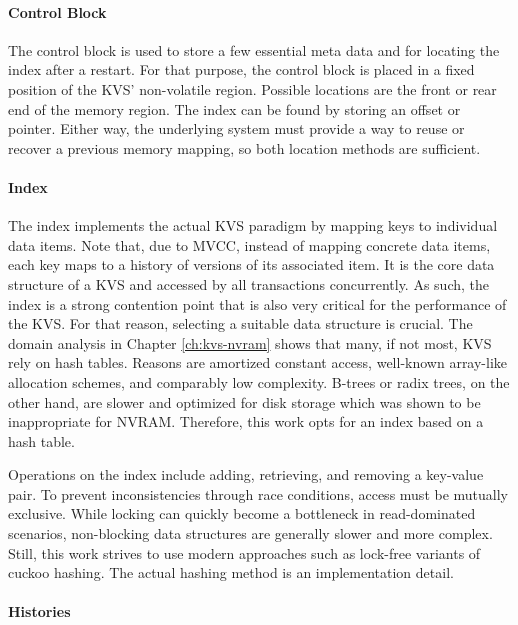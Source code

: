 \paragraph{Control Block}

The control block is used to store a few essential meta data and for locating
the index after a restart. For that purpose, the control block is placed in a
fixed position of the KVS' non-volatile region. Possible locations are the front
or rear end of the memory region. The index can be found by storing an offset or
pointer. Either way, the underlying system must provide a way to reuse or
recover a previous memory mapping, so both location methods are sufficient.

\paragraph{Index}

The index implements the actual KVS paradigm by mapping keys to individual data
items. Note that, due to MVCC, instead of mapping concrete data items, each key
maps to a history of versions of its associated item. It is the core data
structure of a KVS and accessed by all transactions concurrently. As such, the
index is a strong contention point that is also very critical for the
performance of the KVS. For that reason, selecting a suitable data structure is
crucial. The domain analysis in Chapter \ref{ch:kvs-nvram} shows that many, if
not most, KVS rely on hash tables. Reasons are amortized constant access,
well-known array-like allocation schemes, and comparably low complexity. B-trees
or radix trees, on the other hand, are slower and optimized for disk storage
which was shown to be inappropriate for NVRAM. Therefore, this work opts for an
index based on a hash table.

Operations on the index include adding, retrieving, and removing a key-value
pair. To prevent inconsistencies through race conditions, access must be
mutually exclusive. While locking can quickly become a bottleneck in
read-dominated scenarios, non-blocking data structures are generally slower and
more complex. Still, this work strives to use modern approaches such as
lock-free variants of cuckoo hashing. The actual hashing method is an
implementation detail.

\paragraph{Histories}

